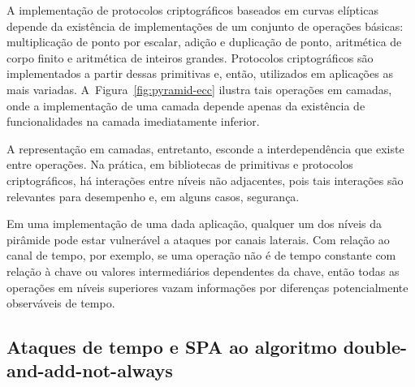 \documentclass{SBCbookchapter}
\begin{document}
A implementação de protocolos criptográficos baseados em curvas elípticas depende da existência de implementações de um conjunto de operações básicas: multiplicação de ponto por escalar, adição e duplicação de ponto, aritmética de corpo finito e aritmética de inteiros grandes. Protocolos criptográficos são implementados a partir dessas primitivas e, então, utilizados em aplicações as mais variadas. A~Figura~\ref{fig:pyramid-ecc} ilustra tais operações em  camadas, onde a implementação de uma camada depende apenas da existência de funcionalidades na camada imediatamente inferior.%

A representação em camadas, entretanto, esconde a interdependência que existe entre operações. Na prática, em bibliotecas de primitivas e protocolos criptográficos, há interações entre níveis não adjacentes, pois tais interações são relevantes para desempenho e, em alguns casos, segurança. 

Em uma implementação de uma dada aplicação, qualquer um dos níveis da pirâmide pode estar vulnerável a ataques por canais laterais. Com relação ao canal de tempo, por exemplo, se uma operação não é de tempo constante com relação à chave ou valores intermediários dependentes da chave, então todas as operações em níveis superiores vazam informações por diferenças potencialmente observáveis de tempo.



\subsection{Ataques de tempo e SPA ao algoritmo double-and-add-not-always}
\end{document}
